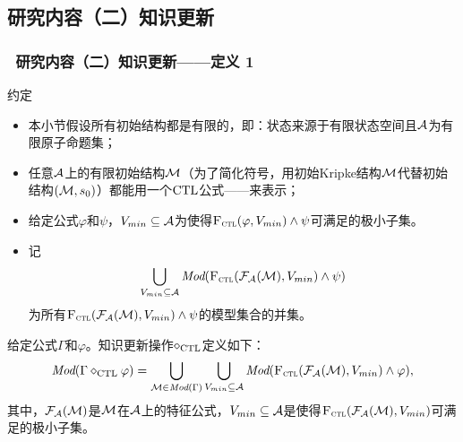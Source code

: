 \documentclass[9pt, CJK]{beamer}
\begin{document}
\subsection{研究内容（二）知识更新}
\begin{frame}
	\frametitle{~研究内容（二）知识更新——{\footnotesize 定义 1}}
	{\footnotesize
		\begin{block}{约定}
			\begin{itemize}
				\item 本小节假设所有初始结构都是有限的，即：状态来源于有限状态空间且${\cal A}$为有限原子命题集；
				\item 任意${\cal A}$上的有限初始结构${\cal M}$（为了简化符号，用初始Kripke结构${\cal M}$代替初始结构$({\cal M},s_0)$）都能用一个$\textrm{CTL}$公式——来表示；
				\item 给定公式$\varphi$和$\psi$，$V_{min}\subseteq {\cal A}$为使得${\textsc{F}_{\textsc{ctl}}}(\varphi, V_{min}) \wedge \psi$可满足的极小子集。
				\item 记
				$$\bigcup_{V_{min}\subseteq {\cal A}} \textit{Mod}({\textsc{F}_{\textsc{ctl}}}({\cal F}_{{\cal A}}({\cal M}), V_{min}) \wedge \psi)$$  
				为所有${\textsc{F}_{\textsc{ctl}}}({\cal F}_{{\cal A}}({\cal M}), V_{min}) \wedge \psi$的模型集合的并集。
			\end{itemize}
		\end{block}
		
		\begin{definition}\label{def:KU}
			给定公式$\Gamma$和$\varphi$。知识更新操作$\diamond_{\textrm{CTL}}$定义如下：
			\[
			\textit{Mod}(\Gamma \diamond_{\textrm{CTL}} \varphi) = \bigcup_{{\cal M} \in \textit{Mod}(\Gamma)} \bigcup_{V_{min}\subseteq {\cal A}} \textit{Mod}({\textsc{F}_{\textsc{ctl}}}({\cal F}_{{\cal A}}({\cal M}), V_{min}) \wedge \varphi),
			\]
			其中，${\cal F}_{{\cal A}}({\cal M})$是${\cal M}$在${\cal A}$上的特征公式，$V_{min} \subseteq {\cal A}$是使得${\textsc{F}_{\textsc{ctl}}}({\cal F}_{{\cal A}}({\cal M}), V_{min})$可满足的极小子集。
		\end{definition}
	}
\end{frame}
\end{document}
